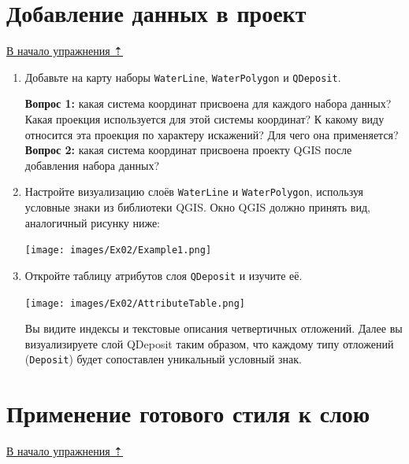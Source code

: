 \documentclass[
  12pt,
]{book}
\begin{document}
\hypertarget{map-design-quaternary-data}{%
\section{Добавление данных в проект}\label{map-design-quaternary-data}}

\protect\hyperlink{map-design-quaternary}{В начало упражнения ⇡}

\begin{enumerate}
\def\labelenumi{\arabic{enumi}.}
\item
  Добавьте на карту наборы \texttt{WaterLine}, \texttt{WaterPolygon} и \texttt{QDeposit}.

  \textbf{Вопрос 1:} какая система координат присвоена для каждого набора данных? Какая проекция используется для этой системы координат? К какому виду относится эта проекция по характеру искажений? Для чего она применяется?\\
  \textbf{Вопрос 2:} какая система координат присвоена проекту QGIS после добавления набора данных?
\item
  Настройте визуализацию слоёв \texttt{WaterLine} и \texttt{WaterPolygon}, используя условные знаки из библиотеки QGIS. Окно QGIS должно принять вид, аналогичный рисунку ниже:

  \texttt{[image: images/Ex02/Example1.png]}
\item
  Откройте таблицу атрибутов слоя \texttt{QDeposit} и изучите её.

  \texttt{[image: images/Ex02/AttributeTable.png]}

  Вы видите индексы и текстовые описания четвертичных отложений. Далее вы визуализируете слой QDeposit таким образом, что каждому типу отложений (\texttt{Deposit}) будет сопоставлен уникальный условный знак.
\end{enumerate}

\hypertarget{map-design-quaternary-classification}{%
\section{Применение готового стиля к слою}\label{map-design-quaternary-classification}}

\protect\hyperlink{map-design-quaternary}{В начало упражнения ⇡}
\end{document}

